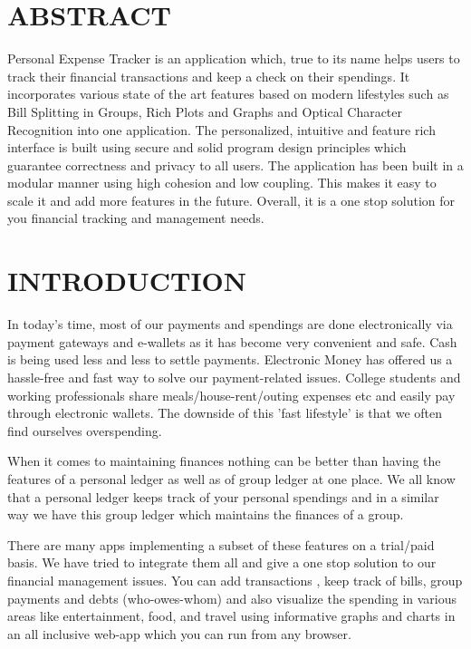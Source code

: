 \documentclass[12pt]{article}
\begin{document}
\tableofcontents
\pagebreak


\section{ABSTRACT}

Personal Expense Tracker is an application which, true to its name helps users to track their financial transactions and keep a check on their spendings. It incorporates various state of the art features based on modern lifestyles such as Bill Splitting in Groups, Rich Plots and Graphs and Optical Character Recognition into one application. The personalized, intuitive and feature rich interface is built using secure and solid program design principles which guarantee correctness and privacy to all users. The application has been built in a modular manner using high cohesion and low coupling. This makes it easy to scale it and add more features in the future. Overall, it is a one stop solution for you financial tracking and management needs.

\newpage

\section{INTRODUCTION}

In today's time, most of our payments and spendings are done electronically via payment gateways and e-wallets as it has become very convenient and safe. Cash is being used less and less to settle payments. Electronic Money has offered us a hassle-free and fast way to solve our payment-related issues. College students and working professionals share meals/house-rent/outing expenses etc and easily pay through electronic wallets. The downside of this 'fast lifestyle' is that we often find ourselves overspending.


When it comes to maintaining finances nothing can be better than having the features of a personal ledger as well as of group ledger at one place. We all know that a personal ledger keeps track of your personal spendings and in a similar way we have this group ledger which maintains the finances of a group. 

There are many apps implementing a subset of these features on a trial/paid basis. We have tried to integrate them all and give a one stop solution to our financial management issues. You can add transactions , keep track of bills, group payments and debts (who-owes-whom) and also visualize the spending in various areas like entertainment, food,  and travel using informative graphs and charts in an all inclusive web-app which you can run from any browser.
\end{document}
